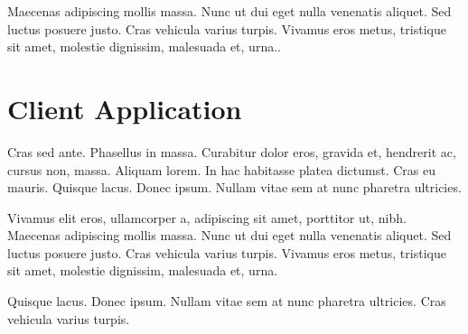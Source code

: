 Maecenas adipiscing mollis massa. Nunc ut dui eget nulla venenatis aliquet. Sed luctus posuere justo. Cras vehicula varius turpis. Vivamus eros metus, tristique sit amet, molestie dignissim, malesuada et, urna..
\section{Client Application}
Cras sed ante. Phasellus in massa. Curabitur dolor eros, gravida et, hendrerit ac, cursus non, massa. Aliquam lorem. In hac habitasse platea dictumst. Cras eu mauris. Quisque lacus. Donec ipsum. Nullam vitae sem at nunc pharetra ultricies. 

Vivamus elit eros, ullamcorper a, adipiscing sit amet, porttitor ut, nibh. Maecenas adipiscing mollis massa. Nunc ut dui eget nulla venenatis aliquet. Sed luctus posuere justo. Cras vehicula varius turpis. Vivamus eros metus, tristique sit amet, molestie dignissim, malesuada et, urna.

Quisque lacus. Donec ipsum. Nullam vitae sem at nunc pharetra ultricies. Cras vehicula varius turpis.



